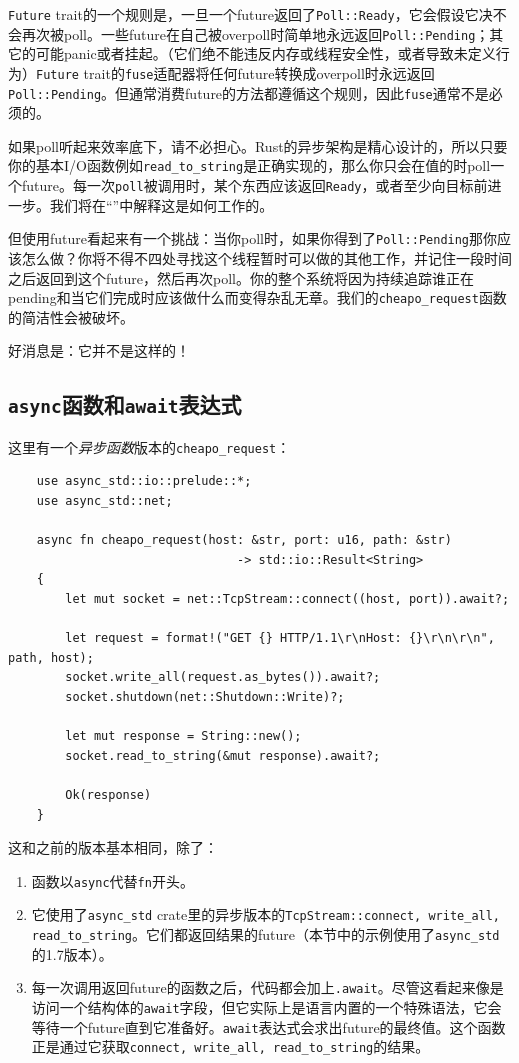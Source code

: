 \texttt{Future} trait的一个规则是，一旦一个future返回了\texttt{Poll::Ready}，它会假设它决不会再次被poll。一些future在自己被overpoll时简单地永远返回\texttt{Poll::Pending}；其它的可能panic或者挂起。（它们绝不能违反内存或线程安全性，或者导致未定义行为）\texttt{Future} trait的\texttt{fuse}适配器将任何future转换成overpoll时永远返回\texttt{Poll::Pending}。但通常消费future的方法都遵循这个规则，因此\texttt{fuse}通常不是必须的。

如果poll听起来效率底下，请不必担心。Rust的异步架构是精心设计的，所以只要你的基本I/O函数例如\texttt{read\_to\_string}是正确实现的，那么你只会在值的时poll一个future。每一次\texttt{poll}被调用时，某个东西应该返回\texttt{Ready}，或者至少向目标前进一步。我们将在“”中解释这是如何工作的。

但使用future看起来有一个挑战：当你poll时，如果你得到了\texttt{Poll::Pending}那你应该怎么做？你将不得不四处寻找这个线程暂时可以做的其他工作，并记住一段时间之后返回到这个future，然后再次poll。你的整个系统将因为持续追踪谁正在pending和当它们完成时应该做什么而变得杂乱无章。我们的\texttt{cheapo\_request}函数的简洁性会被破坏。

好消息是：它并不是这样的！

\subsection{\texttt{async}函数和\texttt{await}表达式}
这里有一个\emph{异步函数}版本的\texttt{cheapo\_request}：
\begin{verbatim}
    use async_std::io::prelude::*;
    use async_std::net;

    async fn cheapo_request(host: &str, port: u16, path: &str)
                                -> std::io::Result<String>
    {
        let mut socket = net::TcpStream::connect((host, port)).await?;

        let request = format!("GET {} HTTP/1.1\r\nHost: {}\r\n\r\n", path, host);
        socket.write_all(request.as_bytes()).await?;
        socket.shutdown(net::Shutdown::Write)?;

        let mut response = String::new();
        socket.read_to_string(&mut response).await?;

        Ok(response)
    }
\end{verbatim}

这和之前的版本基本相同，除了：
\begin{enumerate}
    \item 函数以\texttt{async}代替\texttt{fn}开头。
    \item 它使用了\texttt{async\_std} crate里的异步版本的\texttt{TcpStream::connect, write\_all, read\_to\_string}。它们都返回结果的future（本节中的示例使用了\texttt{async\_std}的1.7版本）。
    \item 每一次调用返回future的函数之后，代码都会加上\texttt{.await}。尽管这看起来像是访问一个结构体的\texttt{await}字段，但它实际上是语言内置的一个特殊语法，它会等待一个future直到它准备好。\texttt{await}表达式会求出future的最终值。这个函数正是通过它获取\texttt{connect, write\_all, read\_to\_string}的结果。
\end{enumerate}

